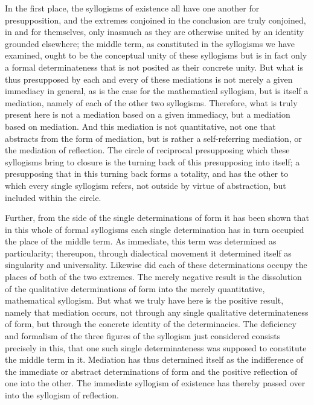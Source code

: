 In the first place, the syllogisms of existence
all have one another for presupposition,
and the extremes conjoined in the conclusion are truly conjoined,
in and for themselves, only inasmuch as they are otherwise
united by an identity grounded elsewhere;
the middle term, as constituted in the syllogisms we have examined,
ought to be the conceptual unity of these syllogisms
but is in fact only a formal determinateness
that is not posited as their concrete unity.
But what is thus presupposed by each and
every of these mediations is not merely
a given immediacy in general,
as is the case for the mathematical syllogism,
but is itself a mediation,
namely of each of the other two syllogisms.
Therefore, what is truly present here is not
a mediation based on a given immediacy,
but a mediation based on mediation.
And this mediation is not quantitative,
not one that abstracts from the form of mediation,
but is rather a self-referring mediation,
or the mediation of reflection.
The circle of reciprocal presupposing
which these syllogisms bring to closure is
the turning back of this presupposing into itself;
a presupposing that in this turning back forms a totality,
and has the other to which every single syllogism refers,
not outside by virtue of abstraction,
but included within the circle.

Further, from the side of the single determinations of form
it has been shown that in this whole of formal syllogisms
each single determination has in turn occupied
the place of the middle term.
As immediate, this term was determined as particularity;
thereupon, through dialectical movement
it determined itself as singularity and universality.
Likewise did each of these determinations occupy the
places of both of the two extremes.
The merely negative result is the dissolution of
the qualitative determinations of form
into the merely quantitative, mathematical syllogism.
But what we truly have here is the positive result,
namely that mediation occurs,
not through any single qualitative determinateness of form,
but through the concrete identity of the determinacies.
The deficiency and formalism of the three figures of the syllogism
just considered consists precisely in this,
that one such single determinateness was
supposed to constitute the middle term in it.
Mediation has thus determined itself as
the indifference of the immediate or abstract determinations of form
and the positive reflection of one into the other.
The immediate syllogism of existence has thereby
passed over into the syllogism of reflection.

